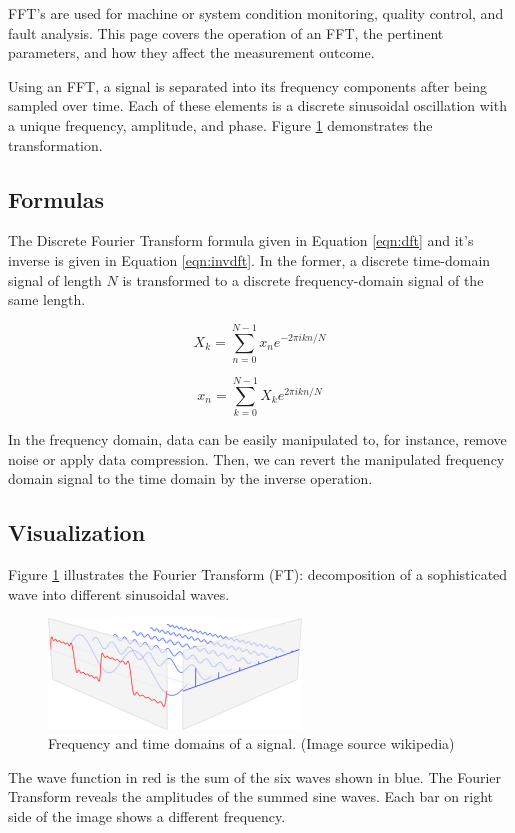 \documentclass[a4paper, 12pt]{scrartcl}
\begin{document}
FFT's are used for machine or system condition monitoring, quality control, and fault analysis.
This page covers the operation of an FFT, the pertinent parameters, and how they affect the measurement outcome.

Using an FFT, a signal is separated into its frequency components after being sampled over time.
Each of these elements is a discrete sinusoidal oscillation with a unique frequency, amplitude, and phase.
Figure \ref{fig:fourier} demonstrates the transformation.

\subsection{Formulas}

The Discrete Fourier Transform formula given in Equation \ref{eqn:dft} and it's inverse is given in Equation \ref{eqn:invdft}.
In the former, a discrete time-domain signal of length $N$ is transformed to a discrete frequency-domain signal of the same length.

\begin{equation}
  \label{eqn:dft}
  X_k = \sum_{n=0}^{N-1} x_n e^{-2 \pi i k n / N}
\end{equation}

\begin{equation}
  \label{eqn:invdft}
  x_n = \sum_{k=0}^{N-1} X_k e^{2 \pi i k n / N}
\end{equation}


In the frequency domain, data can be easily manipulated to, for instance, remove noise or apply data compression.
Then, we can revert the manipulated frequency domain signal to the time domain by the inverse operation.

\subsection{Visualization}

Figure \ref{fig:fourier} illustrates the Fourier Transform (FT): decomposition of a sophisticated wave into different sinusoidal waves.
\begin{figure}[H] 
  \centering
  \includegraphics[width=0.6\textwidth]{img/fourier-dimensions.png}
  \caption{Frequency and time domains of a signal. (Image source wikipedia)}
  \label{fig:fourier}
\end{figure}
The wave function in red is the sum of the six waves shown in blue.
The Fourier Transform reveals the amplitudes of the summed sine waves.
Each bar on right side of the image shows a different frequency.  
\end{document}
